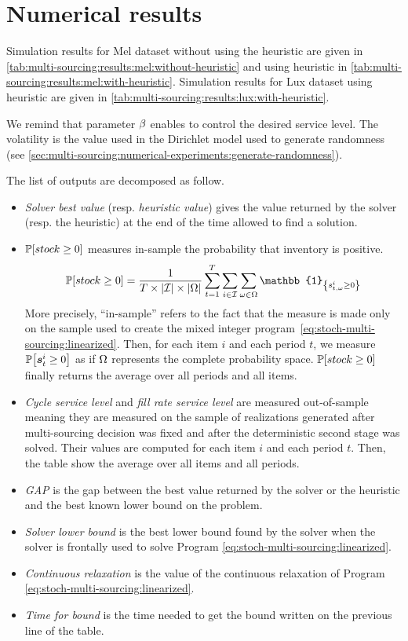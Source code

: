 \section{Numerical results}
\label{sec:multi-sourcing:numerical-experiments:numerical-results}




Simulation results for Mel dataset without using the heuristic are given in \cref{tab:multi-sourcing:results:mel:without-heuristic} and using heuristic in \cref{tab:multi-sourcing:results:mel:with-heuristic}.
Simulation results for Lux dataset using heuristic are given in \cref{tab:multi-sourcing:results:lux:with-heuristic}.


We remind that parameter $\beta$ enables to control the desired service level.
The volatility is the value used in the Dirichlet model used to generate randomness (see \cref{sec:multi-sourcing:numerical-experiments:generate-randomness}).


The list of outputs are decomposed as follow.
\begin{itemize}
  \item \emph{Solver best value} (resp. \emph{heuristic value}) gives the value returned by the solver (resp. the heuristic) at the end of the time allowed to find a solution.
  \item $\prob\sqbracket{stock\ge0}$ measures in-sample the probability that inventory is positive.
  $$\prob\sqbracket{stock\ge0}=\frac{1}{\horizon\times\card{\REF}\times\card{\scenarios}}\sum_{t=1}^{\horizon}\sum_{i\in\REF}\sum_{\omega\in\scenarios} \mathbb{1}_{\crbracket{\inventory_{t,\omega}^i\ge0}}$$
  More precisely, ``in-sample'' refers to the fact that the measure is made only on the sample used to create the mixed integer program~\eqref{eq:stoch-multi-sourcing:linearized}.
  Then, for each item $i$ and each period $t$, we measure $\prob\sqbracket{\va\inventory_t^i\ge0}$ as if $\Omega$ represents the complete probability space.
  $\prob\sqbracket{stock\ge0}$ finally returns the average over all periods and all items.
  \item \emph{Cycle service level} and \emph{fill rate service level} are measured out-of-sample meaning they are measured on the sample of realizations generated after multi-sourcing decision was fixed and after the deterministic second stage was solved.
  Their values are computed for each item $i$ and each period $t$.
  Then, the table show the average over all items and all periods.
  \item \emph{GAP} is the gap between the best value returned by the solver or the heuristic and the best known lower bound on the problem.
  \item \emph{Solver lower  bound} is the best lower bound found by the solver when the solver is frontally used to solve Program \eqref{eq:stoch-multi-sourcing:linearized}.
  \item \emph{Continuous relaxation} is the value of the continuous relaxation of Program \eqref{eq:stoch-multi-sourcing:linearized}.
  \item \emph{Time for bound} is the time needed to get the bound written on the previous line of the table.
\end{itemize}


